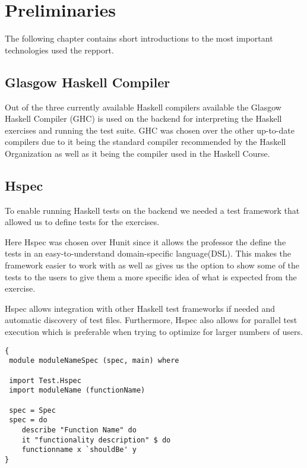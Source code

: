 \chapter{Preliminaries}
The following chapter contains short introductions to the most important technologies used the repport. 

\section{Glasgow Haskell Compiler} %
Out of the three currently available Haskell compilers available the Glasgow Haskell Compiler (GHC) is used on the backend for interpreting the Haskell exercises and running the test suite. GHC was chosen over the other up-to-date compilers due to it being the standard compiler recommended by the Haskell Organization \cite{} as well as it being the compiler used in the Haskell Course.

\section{Hspec}
To enable running Haskell tests on the backend we needed a test framework that allowed us to define tests for the exercises. 

Here Hspec was chosen over Hunit since it allows the professor the define the tests in an easy-to-understand domain-specific language(DSL). 
This makes the framework easier to work with as well as gives us the option to show some of the tests to the users to give them a more specific idea of what is expected from the exercise.

Hspec allows integration with other Haskell test frameworks if needed and automatic discovery of test files. 
Furthermore, Hspec also allows for parallel test execution which is preferable when trying to optimize for larger numbers of users.

\begin{lstlisting}[language=CSharp, caption={An example of a Hspec Test.}, label={lst:HspecTestExample}]
{
 module moduleNameSpec (spec, main) where

 import Test.Hspec
 import moduleName (functionName)
 
 spec = Spec
 spec = do
 	describe "Function Name" do
 	it "functionality description" $ do
	functionname x `shouldBe' y
}
\end{lstlisting}

